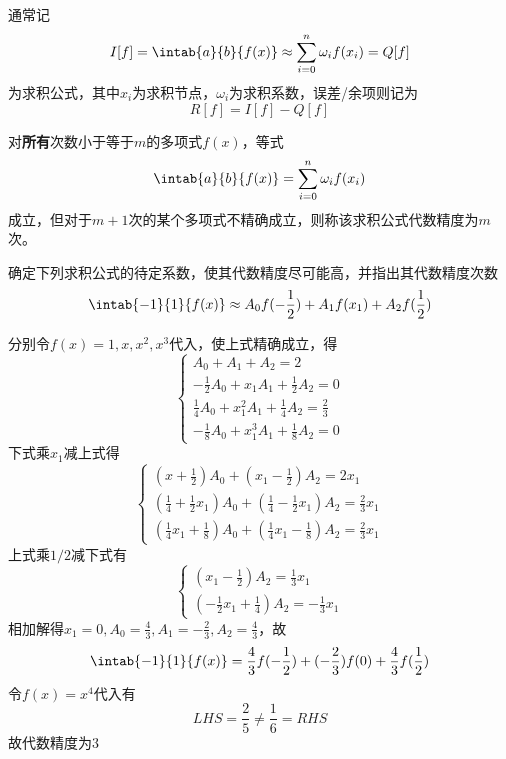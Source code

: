 通常记
\[I[f]=\intab{a}{b}{f(x)}\approx\sum_{i=0}^n\omega_i f(x_i)=Q[f]\]
为求积公式，其中$x_i$为求积节点，$\omega_i$为求积系数，误差/余项则记为
\[R[f]=I[f]-Q[f]\]
\begin{definition}[代数精度]
    对\textbf{所有}次数小于等于$m$的多项式$f(x)$，等式
    \[\intab{a}{b}{f(x)}=\sum_{i=0}^n\omega_i f(x_i)\]
    成立，但对于$m+1$次的某个多项式不精确成立，则称该求积公式代数精度为$m$次。
\end{definition}

\begin{example}
    确定下列求积公式的待定系数，使其代数精度尽可能高，并指出其代数精度次数
    \[\intab{-1}{1}{f(x)}\approx A_0f(-\frac{1}{2})+A_1f(x_1)+A_2f(\frac{1}{2})\]
\end{example}
\begin{analysis}
    分别令$f(x)=1,x,x^2,x^3$代入，使上式精确成立，得
    \[\begin{cases}
        A_0+A_1+A_2=2\\
        -\frac{1}{2}A_0+x_1A_1+\frac{1}{2}A_2=0\\
        \frac{1}{4}A_0+x_1^2A_1+\frac{1}{4}A_2=\frac{2}{3}\\
        -\frac{1}{8}A_0+x_1^3A_1+\frac{1}{8}A_2=0
    \end{cases}\]
    下式乘$x_1$减上式得
    \[\begin{cases}
        (x+\frac{1}{2})A_0+(x_1-\frac{1}{2})A_2=2x_1\\
        (\frac{1}{4}+\frac{1}{2}x_1)A_0+(\frac{1}{4}-\frac{1}{2}x_1)A_2=\frac{2}{3}x_1\\
        (\frac{1}{4}x_1+\frac{1}{8})A_0+(\frac{1}{4}x_1-\frac{1}{8})A_2=\frac{2}{3}x_1
    \end{cases}\]
    上式乘$1/2$减下式有
    \[\begin{cases}
        (x_1-\frac{1}{2})A_2=\frac{1}{3}x_1\\
        (-\frac{1}{2}x_1+\frac{1}{4})A_2=-\frac{1}{3}x_1
    \end{cases}\]
    相加解得$x_1=0,A_0=\frac{4}{3},A_1=-\frac{2}{3},A_2=\frac{4}{3}$，故
    \[\intab{-1}{1}{f(x)}=\frac{4}{3}f(-\frac{1}{2})+(-\frac{2}{3})f(0)+\frac{4}{3}f(\frac{1}{2})\]
    令$f(x)=x^4$代入有
    \[LHS=\frac{2}{5}\ne\frac{1}{6}=RHS\]
    故代数精度为$3$
\end{analysis}

